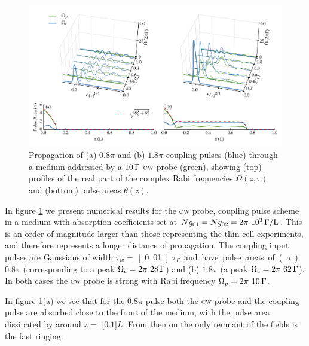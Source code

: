     \begin{figure}[h]
    \includegraphics[width=\linewidth]
      {figs/06_simultons/mb_vee_sit_plot_08pi_18pi_fig1.pdf}
    \caption{
    Propagation of (a) $0.8 \pi$ and (b) $1.8 \pi$ coupling pulses (blue)
    through a medium addressed by a $\unit[10]{\Gamma}$ \textsc{cw} probe
    (green), showing (top) profiles of the real part of the complex Rabi
    frequencies $\Omega(z, \tau)$ and (bottom) pulse areas $\theta(z)$.
    }
    \label{fig:pulse_cw_08pi_18pi}
    \end{figure}

    In figure \ref{fig:pulse_cw_08pi_18pi} we present numerical results for the
    \textsc{cw} probe, coupling pulse scheme in a medium with absorption
    coefficients set at $N g_{01} = N g_{02} = \unit[2\pi~10^3]{\Gamma/L}$. This
    is an order of magnitude larger than those representing the thin cell
    experiments, and therefore represents a longer distance of propagation. The
    coupling input pulses are Gaussians of width $\tau_w = $
    \unit[0.01]{$\tau_\Gamma$} and have pulse areas of (a) $0.8 \pi$
    (corresponding to a peak $\Omega_c = \unit[2\pi~28]{\Gamma}$) and (b) $1.8
    \pi$ (a peak $\Omega_c = \unit[2\pi~62]{\Gamma}$). In both cases the
    \textsc{cw} probe is strong with Rabi frequency $\Omega_p =
    \unit[2\pi~10]{\Gamma}$.

    In figure \ref{fig:pulse_cw_08pi_18pi}(a) we see that for the $0.8 \pi$ pulse both
    the \textsc{cw} probe and the coupling pulse are absorbed close to the front
    of the medium, with the pulse area dissipated by around $z = $
    \unit[$0.1$]{$L$}. From then on the only remnant of the fields is the fast
    ringing.

